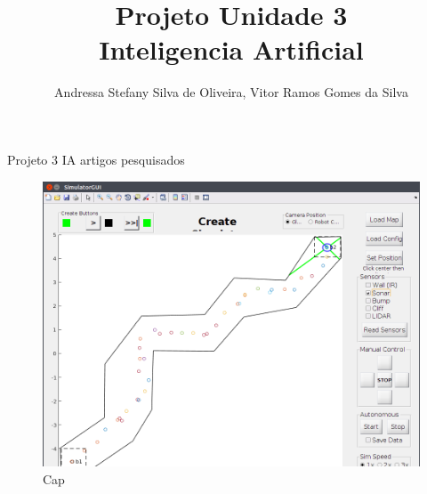 \documentclass{article}
\title{Projeto Unidade 3\\Inteligencia Artificial\null\vfill}
\author{Andressa Stefany Silva de Oliveira, Vitor Ramos Gomes da Silva}
\begin{document}
	\maketitle
	\begin{titlepage}
	\end{titlepage}
	Projeto 3 IA artigos pesquisados \cite{DUMMY:1, DUMMY:2}

	\begin{figure}
		\graphicspath{ {resultados/} }
		\includegraphics[width=\linewidth]{res1.png}
		\caption{Cap}
		\label{fig:numeros}
	\end{figure}		
	
	
	
\end{document}
